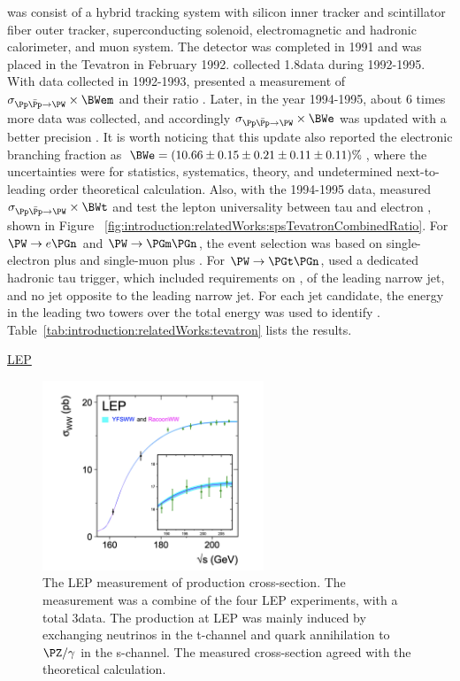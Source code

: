 \DZERO was consist of a hybrid tracking system with silicon inner tracker and scintillator fiber outer tracker, superconducting solenoid, electromagnetic and hadronic calorimeter, and muon system. The detector was completed in 1991 and was placed in the Tevatron in February 1992.  \DZERO collected 1.8\TeV data during 1992-1995. With data collected in 1992-1993,  \DZERO presented a measurement of $\sigma_{\Pp\bar{\Pp}\to \PW} \times \BWem$ and their ratio \cite{Abachi:1995xc}. Later, in the year 1994-1995, about 6 times more data was collected, and accordingly $\sigma_{\Pp\bar{\Pp}\to \PW} \times \BWe$ was updated with a better precision \cite{Abbott:1999tt}. It is worth noticing that this update \cite{Abbott:1999tt} also reported the electronic branching fraction as $\BWe=(10.66\pm0.15\pm0.21\pm0.11\pm0.11)\%$, where the uncertainties were for statistics, systematics, theory, and undetermined next-to-leading order theoretical calculation. Also, with the 1994-1995 data,  \DZERO measured $\sigma_{\Pp\bar{\Pp}\to \PW} \times \BWt$ and test the lepton universality between tau and electron \cite{Abbott:1999pk}, shown in Figure ~\ref{fig:introduction:relatedWorks:spsTevatronCombinedRatio}. For $\PW \to e \PGn$ and $\PW \to \PGm \PGn$, the event selection was based on single-electron plus \MET and single-muon plus \MET. For $\PW \to \PGt \PGn$,  \DZERO used a dedicated hadronic tau trigger, which included requirements on \MET, \pt of the leading narrow jet, and no jet opposite to the leading narrow jet. For each jet candidate, the energy in the leading two towers over the total energy was used to identify \PGth. Table~\ref{tab:introduction:relatedWorks:tevatron} lists the  \DZERO results.




\underline{LEP}

\begin{figure}[ht]
    \centering
    \includegraphics[width=0.59\textwidth]{chapters/introduction/sectionRelatedWorks/figures/lepCrosssection.png}
    \caption{The LEP measurement of \WW production cross-section. The measurement was a combine of the four LEP experiments, with a total 3\fbinv  data. The \WW production at LEP was mainly induced by exchanging neutrinos in the t-channel and quark annihilation to $\PZ/\gamma$  in the s-channel. The measured cross-section agreed with the theoretical calculation.}
    \label{fig:introduction:relatedWorks:lepCrosssection}
\end{figure}


